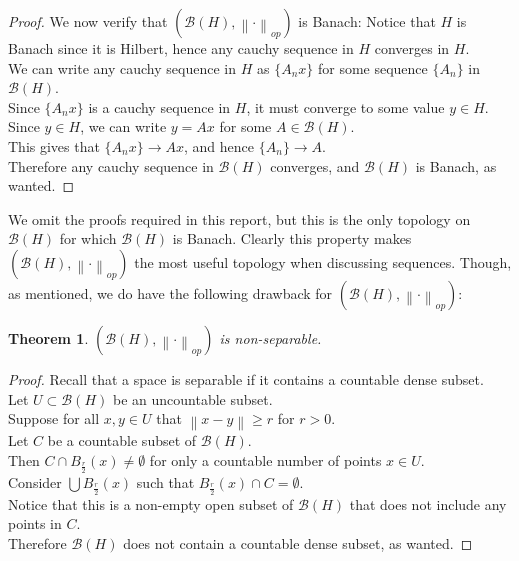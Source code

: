 \documentclass{article}
\theoremstyle{plain}
\newtheorem{theorem}{Theorem}
\theoremstyle{definition}
\newcommand{\norm}[1]{\left\lVert #1 \right\rVert}
\newcommand{\BH}{\cal{B}(H)}
\renewcommand{\cal}[1]{\mathcal{#1}}
\begin{document}
\begin{proof}
                We now verify that $(\BH, \norm{\cdot}_{op})$ is Banach:
                Notice that $H$ is Banach since it is Hilbert, hence any cauchy sequence in $H$ converges in $H$.\\
                We can write any cauchy sequence in $H$ as $\{A_n x\}$ for some sequence $\{A_n\}$ in $\BH$.\\
                Since $\{A_n x\}$ is a cauchy sequence in $H$, it must converge to some value $y \in H$.\\
                Since $y \in H$, we can write $y = Ax$ for some $A \in \BH$.\\
                This gives that $\{A_n x\} \to Ax$, and hence $\{A_n\} \to A$.\\
                Therefore any cauchy sequence in $\BH$ converges, and $\BH$ is Banach, as wanted.
        \end{proof}
        We omit the proofs required in this report, but this is the only topology on $\BH$ for which $\BH$ is Banach.
        Clearly this property makes $(\BH, \norm{\cdot}_{op})$ the most useful topology when discussing sequences.
        Though, as mentioned, we do have the following drawback for $(\BH, \norm{\cdot}_{op})$:
        \begin{theorem}
                $(\BH, \norm{\cdot}_{op})$ is non-separable.
        \end{theorem}
        \begin{proof}
                Recall that a space is separable if it contains a countable dense subset.\\
                Let $U \subset \BH$ be an uncountable subset.\\
                Suppose for all $x, y \in U$ that $\norm{x - y} \geq r$ for $r > 0$.\\
                Let $C$ be a countable subset of $\BH$.\\
                Then $C \cap B_\frac{r}{2}(x) \neq \emptyset$ for only a countable number of points $x \in U$.\\
                Consider $\bigcup B_\frac{r}{2}(x)$ such that $B_\frac{r}{2}(x) \cap C = \emptyset$.\\
                Notice that this is a non-empty open subset of $\BH$ that does not include any points in $C$.\\
                Therefore $\BH$ does not contain a countable dense subset, as wanted.
        \end{proof}
\end{document}
